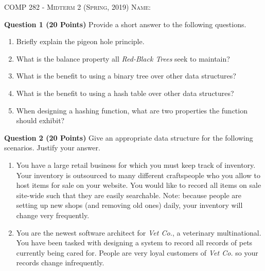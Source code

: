 \documentclass{letter}
\newcommand{\heading}[1]{{\large \textsc{#1}}}
\begin{document}
\heading{COMP 282 - Midterm 2 (Spring, 2019)}
\kern 2cm
\heading{Name:}

{\bf Question 1 (20 Points)} \kern 0.5cm Provide a short answer to the following
questions.

\begin{enumerate}[label=(\alph*)]

\item Briefly explain the pigeon hole principle.

\vspace{3cm}

\item What is the balance property all {\em Red-Black Trees} seek to maintain?

\vspace{3cm}

\item What is the benefit to using a binary tree over other data structures?

\vspace{3cm}

\item What is the benefit to using a hash table over other data structures?

\vspace{3cm}

\item When designing a hashing function, what are two properties the function
should exhibit?

\end{enumerate}

\clearpage

{\bf Question 2 (20 Points)} \kern 0.5cm Give an appropriate data structure for
the following scenarios.  Justify your answer.

\begin{enumerate}[label=(\alph*)]

\item You have a large retail business for which you must keep track of
inventory.  Your inventory is outsourced to many different craftspeople who you
allow to host items for sale on your website.  You would like to record all
items on sale site-wide such that they are easily searchable.  Note: because
people are setting up new shops (and removing old ones) daily, your inventory
will change very frequently.

\vspace{6cm}

\item You are the newest software architect for {\em Vet Co.}, a veterinary
multinational.  You have been tasked with designing a system to record all
records of pets currently being cared for.  People are very loyal customers of
{\em Vet Co.} so your records change infrequently.

\end{enumerate}
\end{document}
